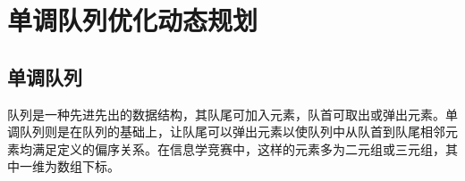 \begin{Shaded}
\begin{Highlighting}[]
    \OperatorTok{(!}\OperatorTok{\&\&} \OperatorTok{!}\OperatorTok{)}\OperatorTok{[}\OperatorTok{][}\OperatorTok{]} \OperatorTok{=}\OperatorTok{;}
    \OperatorTok{;}
\OperatorTok{\}}
\OperatorTok{(}\OperatorTok{)} \OperatorTok{\{}
    \OperatorTok{=} \OperatorTok{;}
    \OperatorTok{(}\OperatorTok{)}
\OperatorTok{[++}\OperatorTok{]} \OperatorTok{=}\OperatorTok{\%} \OperatorTok{,}\OperatorTok{/=} \OperatorTok{;}
\OperatorTok{(}\OperatorTok{,} \OperatorTok{{-}}\OperatorTok{,} \OperatorTok{(}\OperatorTok{));}
    \OperatorTok{(}\OperatorTok{,} \OperatorTok{{-}}\OperatorTok{,} \OperatorTok{,} \OperatorTok{);}
\OperatorTok{\}}
\OperatorTok{()} \OperatorTok{\{}
\OperatorTok{\textgreater{}\textgreater{}}\OperatorTok{\textgreater{}\textgreater{}}\OperatorTok{;}
\OperatorTok{\textless{}\textless{}}\OperatorTok{(}\OperatorTok{)} \OperatorTok{{-}}\OperatorTok{(}\OperatorTok{{-}} \OperatorTok{)} \OperatorTok{\textless{}\textless{}}\OperatorTok{;}
     \OperatorTok{;}
\OperatorTok{\}}
\end{Highlighting}
\end{Shaded}

\section{单调队列优化动态规划}

\subsection{单调队列}

队列是一种先进先出的数据结构，其队尾可加入元素，队首可取出或弹出元素。单调队列则是在队列的基础上，让队尾可以弹出元素以使队列中从队首到队尾相邻元素均满足定义的偏序关系。在信息学竞赛中，这样的元素多为二元组或三元组，其中一维为数组下标。

